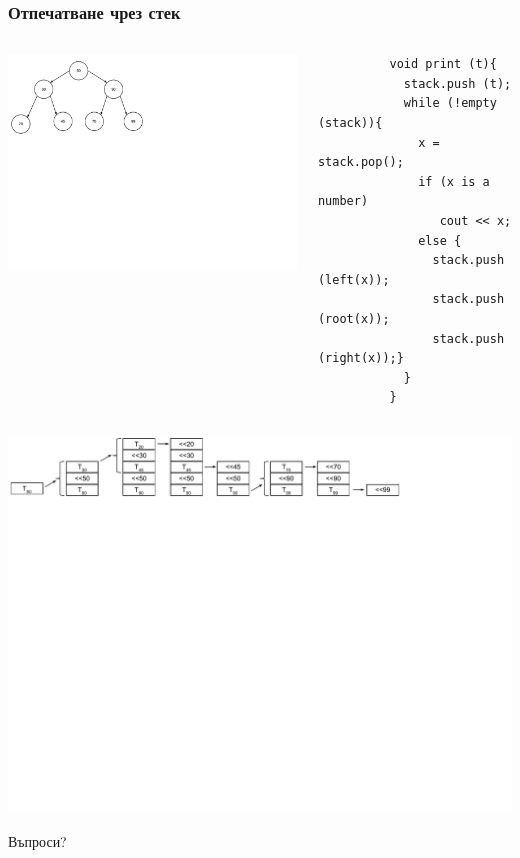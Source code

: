 \documentclass{beamer}
\begin{document}
\begin{frame}[fragile]
\frametitle{Отпечатване чрез стек}


\begin{columns}[t]
  \begin{column}{0.4\textwidth}

\includegraphics[width=11cm]{images/tree_bot_clean}
  \end{column}
  \begin{column}{0.6\textwidth}
  
      \begin{flushleft}
        \begin{lstlisting}
          void print (t){
            stack.push (t);
            while (!empty (stack)){
              x = stack.pop();
              if (x is a number) 
                 cout << x;
              else {
                stack.push (left(x)); 
                stack.push (root(x));
                stack.push (right(x));}
            }
          }
        \end{lstlisting}
      \end{flushleft}

  \end{column}
\end{columns}

\vspace{-120px}
\includegraphics[width=15cm]{images/tree_print_with_stack}


\end{frame}


\begin{frame}
\centerline{Въпроси?}
\end{frame}
\end{document}
